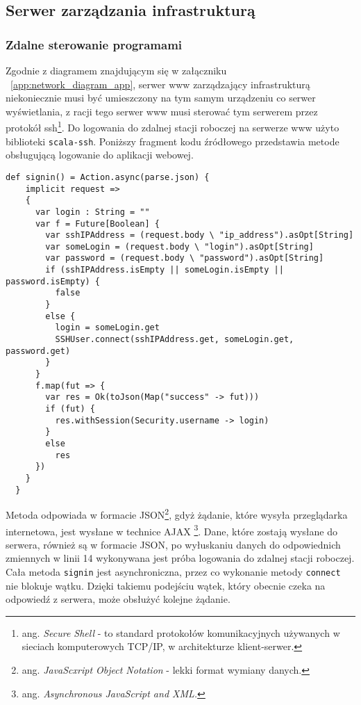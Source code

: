 \subsection{Serwer zarządzania infrastrukturą}

\subsubsection{Zdalne sterowanie programami}

Zgodnie z diagramem znajdującym się w załączniku ~\ref{app:network_diagram_app}, serwer www zarządzający infrastrukturą niekoniecznie musi być umieszczony na tym samym urządzeniu co serwer wyświetlania, z racji tego serwer www musi sterować tym serwerem przez protokół ssh\footnote{ang. \emph{Secure Shell} - to standard protokołów komunikacyjnych używanych w sieciach komputerowych TCP/IP, w architekturze klient-serwer.\cite{ssh-wiki}}.
Do logowania do zdalnej stacji roboczej na serwerze www użyto biblioteki \lstinline{scala-ssh}. Poniższy fragment kodu źródłowego przedstawia metode obsługującą logowanie do aplikacji webowej.

\begin{lstlisting}
def signin() = Action.async(parse.json) {
    implicit request =>
    {
      var login : String = ""
      var f = Future[Boolean] {
        var sshIPAddress = (request.body \ "ip_address").asOpt[String]
        var someLogin = (request.body \ "login").asOpt[String]
        var password = (request.body \ "password").asOpt[String]
        if (sshIPAddress.isEmpty || someLogin.isEmpty || password.isEmpty) {
          false
        }
        else {
          login = someLogin.get
          SSHUser.connect(sshIPAddress.get, someLogin.get, password.get)
        }
      }
      f.map(fut => {
        var res = Ok(toJson(Map("success" -> fut)))
        if (fut) {
          res.withSession(Security.username -> login)
        }
        else
          res
      })
    }
  }
\end{lstlisting}

Metoda odpowiada w formacie JSON\footnote{ang. \emph{JavaScxript Object Notation} - lekki format wymiany danych.}, gdyż żądanie, które wysyła przeglądarka internetowa, jest wysłane w technice AJAX \footnote{ang. \emph{Asynchronous JavaScript and XML.}}. Dane, które zostają wysłane do serwera, również są w formacie JSON, po wyłuskaniu danych do odpowiednich zmiennych w linii 14 wykonywana jest próba logowania do zdalnej stacji roboczej. Cała metoda \lstinline{signin} jest asynchroniczna, przez co wykonanie metody \lstinline{connect} nie blokuje wątku. Dzięki takiemu podejściu wątek, który obecnie czeka na odpowiedź z serwera, może obsłużyć kolejne żądanie.

